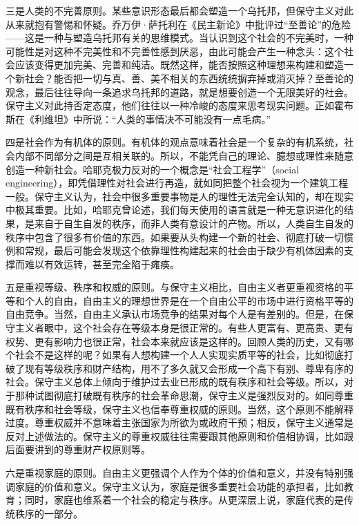 三是人类的不完善原则。某些意识形态最后都会塑造一个乌托邦，但保守主义对此从来就抱有警惕和怀疑。乔万伊·萨托利在《民主新论》中批评过“至善论”的危险——这是一种与塑造乌托邦有关的思维模式。当认识到这个社会的不完美时，一种可能性是对这种不完美性和不完善性感到厌恶，由此可能会产生一种念头：这个社会应该变得更加完美、完善和纯洁。既然这样，能否按照这种理想来构建和塑造一个新社会？能否把一切与真、善、美不相关的东西统统摒弃掉或消灭掉？至善论的观念，最后往往导向一条追求乌托邦的道路，就是想要创造一个无限美好的社会。保守主义对此持否定态度，他们往往以一种冷峻的态度来思考现实问题。正如霍布斯在《利维坦》中所说：“人类的事情决不可能没有一点毛病。”

四是社会作为有机体的原则。有机体的观点意味着社会是一个复杂的有机系统，社会内部不同部分之间是互相关联的。所以，不能凭自己的理论、臆想或理性来随意创造一种新社会。哈耶克极力反对的一个概念是“社会工程学”（social engineering），即凭借理性对社会进行再造，就如同把整个社会视为一个建筑工程一般。保守主义认为，社会中很多重要事物是人的理性无法完全认知的，却在现实中极其重要。比如，哈耶克曾论述，我们每天使用的语言就是一种无意识进化的结果，是来自于自生自发的秩序，而非人类有意设计的产物。所以，人类自生自发的秩序中包含了很多有价值的东西。如果要从头构建一个新的社会、彻底打破一切惯例和常规，最后可能会发现这个依靠理性构建起来的社会由于缺少有机体因素的支撑而难以有效运转，甚至完全陷于瘫痪。

五是重视等级、秩序和权威的原则。与保守主义相比，自由主义者更重视资格的平等和个人的自由，自由主义的理想世界是在一个自由公平的市场中进行资格平等的自由竞争。当然，自由主义承认市场竞争的结果对每个人是有差别的。但是，在保守主义者眼中，这个社会存在等级本身是很正常的。有些人更富有、更高贵、更有权势、更有影响力也很正常，社会本来就应该是这样的。回顾人类的历史，又有哪个社会不是这样的呢？如果有人想构建一个人人实现实质平等的社会，比如彻底打破了现有等级秩序和财产结构，用不了多久就又会形成一个高下有别、尊卑有序的社会。保守主义总体上倾向于维护过去业已形成的既有秩序和社会等级。所以，对于那种试图彻底打破既有秩序的社会革命思潮，保守主义是强烈反对的。如同尊重既有秩序和社会等级，保守主义也信奉尊重权威的原则。当然，这个原则不能解释过度。尊重权威并不意味着主张国家为所欲为或政府干预；相反，保守主义通常是反对上述做法的。保守主义的尊重权威往往需要跟其他原则和价值相协调，比如跟后面要讲到的尊重财产权原则等。

六是重视家庭的原则。自由主义更强调个人作为个体的价值和意义，并没有特别强调家庭的价值和意义。保守主义认为，家庭是很多重要社会功能的承担者，比如教育；同时，家庭也维系着一个社会的稳定与秩序。从更深层上说，家庭代表的是传统秩序的一部分。

